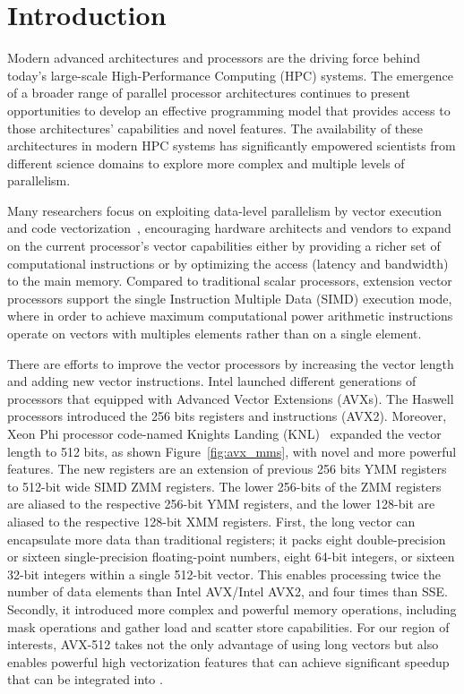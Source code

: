 \documentclass[conference]{IEEEtran}
\begin{document}
\section{Introduction}\label{sec:intro}

Modern advanced architectures and processors are the driving force behind
today’s large-scale High-Performance Computing (HPC) systems. The emergence of
a broader range of parallel processor architectures continues to present
opportunities to develop an effective programming model that provides access to
those architectures' capabilities and novel features.
%
The availability of these architectures in modern HPC systems has significantly
empowered scientists from different science domains to explore  more complex and
multiple levels of parallelism.

%
Many researchers focus on exploiting data-level parallelism by vector execution
and code vectorization~\cite{Vectorizing-Compilers, VectorArchitectures},
encouraging hardware architects and vendors to expand on the current processor's
vector capabilities either by providing a richer set of computational
instructions or by optimizing the access (latency and bandwidth) to the main
memory.
%
Compared to traditional scalar processors, extension vector processors support
the single Instruction Multiple Data (SIMD) execution mode, where in order to
achieve maximum computational power arithmetic instructions operate on vectors
with multiples elements rather than on a single element.
%

There are efforts to improve the vector processors by increasing the vector length and adding new vector instructions.
Intel launched different generations of processors that equipped with Advanced Vector Extensions (AVXs).
The Haswell processors introduced the 256 bits registers and instructions (AVX2).
Moreover, Xeon Phi processor code-named Knights Landing (KNL)~\cite{avx-info, Intelref} expanded
the vector length to 512 bits, as shown Figure~\ref{fig:avx_mms}, with novel and more powerful features.
The new registers are an extension of previous 256 bits YMM registers to 512-bit wide SIMD ZMM registers.
The lower 256-bits of the ZMM registers are aliased to the respective 256-bit YMM registers, and the lower 128-bit are
aliased to the respective 128-bit XMM registers.
First, the long vector can encapsulate more data than traditional registers; it packs eight double-precision or sixteen single-precision floating-point numbers, eight 64-bit integers, or sixteen 32-bit integers within a single 512-bit vector. This enables processing twice the number of data elements than Intel AVX/Intel AVX2, and four times than SSE.
Secondly, it introduced more complex and powerful memory operations,
including mask operations and gather load and scatter store capabilities.
For our region of interests, AVX-512 takes not the only advantage of using long vectors but also enables powerful high vectorization features that can achieve significant speedup that can be integrated into \ompi.
\end{document}
